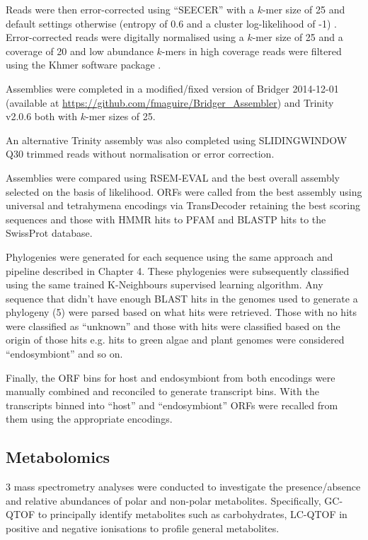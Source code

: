 Reads were then error-corrected using ``SEECER'' with a \(k\)-mer size of 25 and 
default settings otherwise (entropy of 0.6 and a cluster log-likelihood
of -1) \citep{Le2013}.  Error-corrected reads were digitally normalised
using a \(k\)-mer size of 25 and a coverage of 20 \citep{Brown2012} and 
low abundance \(k\)-mers in high coverage reads were filtered \citep{Zhang2014,Zhang2015}
using the Khmer software package \citep{Doring2008,Crusoe2015}.

Assemblies were completed in a modified/fixed version of 
Bridger 2014-12-01 \citep{Chang2015} (available at
\url{https://github.com/fmaguire/Bridger_Assembler}) and 
Trinity v2.0.6 \citep{Grabherr2011,Haas2013} both with \(k\)-mer
sizes of 25.

An alternative Trinity assembly was also completed using
SLIDINGWINDOW Q30 trimmed reads without normalisation or 
error correction.

Assemblies were compared using RSEM-EVAL \citep{Li2014} and the best
overall assembly selected on the basis of likelihood.
ORFs were called from the best assembly using universal and tetrahymena encodings 
via TransDecoder \citep{Haas2013} retaining the best scoring sequences and those
with HMMR hits to PFAM and BLASTP hits to the SwissProt database. 

Phylogenies were generated for each sequence using the same approach and pipeline
described in Chapter 4. These phylogenies were subsequently classified using the 
same trained K-Neighbours supervised learning algorithm.
Any sequence that didn't have enough BLAST hits in the genomes used to generate
a phylogeny (5) were parsed based on what hits were retrieved.
Those with no hits were classified as ``unknown'' and those with
hits were classified based on the origin of those hits e.g. hits
to green algae and plant genomes were considered ``endosymbiont'' and so on.

Finally, the ORF bins for host and endosymbiont 
from both encodings were manually combined and reconciled
to generate transcript bins.  With the transcripts binned into
``host'' and ``endosymbiont'' ORFs were recalled from them using the appropriate
encodings. 

\subsection{Metabolomics}

3 mass spectrometry analyses were conducted to investigate the presence/absence
and relative abundances of polar and non-polar metabolites.
Specifically, GC-QTOF to principally identify metabolites such as carbohydrates,
LC-QTOF in positive and negative ionisations to profile general metabolites.

